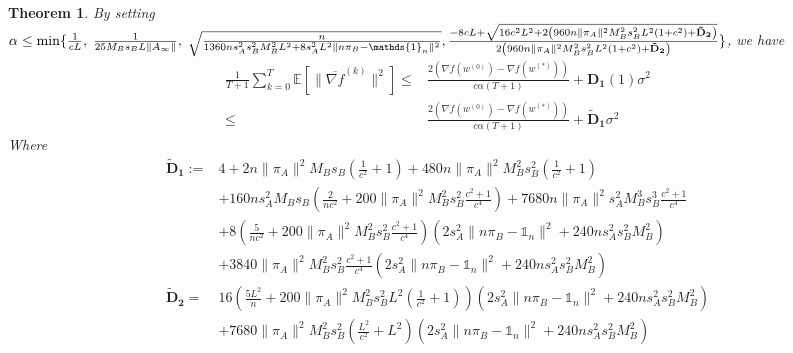 \documentclass{article}
\newtheorem{theorem}{Theorem}
\newcommand{\EE}[1]{\mathbb{E}\left[#1\right]}
\newcommand{\norm}[1]{\| #1 \|}
\newcommand{\one}{\mathds{1}_n}
\begin{document}
\begin{theorem}\label{Main Theorem: Basic 2}
  By setting $\alpha \leq \min\{\frac{1}{cL} ,\;\frac{1}{25M_Bs_BL\norm{A_{\infty}}},\; \sqrt{\frac{n}{1360ns_A^2s_B^2M_B^2L^2+8s_A^2L^2\norm{n\pi_B-\one}^2}},\; \\\frac{-8cL+\sqrt{16c^2L^2+2\left(960n\norm{\pi_A}^2M_B^2s_B^2L^2\left(1+c^2\right)+\mathbf{\tilde{D}_2}\right)}}{2\left(960n\norm{\pi_A}^2M_B^2s_B^2L^2\left(1+c^2\right)+\mathbf{\tilde{D}_2}\right)}\} $, we have 
  \begin{align*}
 \frac{1}{T+1}\sum_{k=0}^T\EE{\norm{\overline{\nabla f}^{(k)}}^2}\leq&\frac{2(\nabla f(w^{(0)})-\nabla f(w^{(*)}))}{c\alpha(T+1)}+\mathbf{D_1}(1)\sigma^2\\
 \leq&\frac{2(\nabla f(w^{(0)})-\nabla f(w^{(*)}))}{c\alpha(T+1)}+\mathbf{\tilde{D}_1}\sigma^2
\end{align*}
  Where 
  \begin{align*}
\mathbf{\tilde{D}_1}:=&4+2n\norm{\pi_A}^2M_Bs_B\left(\frac{1}{c^2}+1\right)+480n\norm{\pi_A}^2M_B^2s_B^2\left(\frac{1}{c^2}+1\right)\\
    &+160ns_A^2M_Bs_B\left(\frac{2}{nc^2}+200\norm{\pi_A}^2M_B^2s_B^2\frac{c^2+1}{c^4}\right)+7680n\norm{\pi_A}^2s_A^2M_B^3s_B^3\frac{c^2+1}{c^4}\\
    &+8\left(\frac{5}{nc^2}+200\norm{\pi_A}^2M_B^2s_B^2\frac{c^2+1}{c^4}\right)\left(2s_A^2\norm{n\pi_B-\one}^2+240ns_A^2s_B^2M_B^2\right)\\
    &+3840\norm{\pi_A}^2M_B^2s_B^2\frac{c^2+1}{c^4}\left(2s_A^2\norm{n\pi_B-\one}^2+240ns_A^2s_B^2M_B^2\right)\\
    \mathbf{\tilde{D}_2}=&16\left(\frac{5L^2}{n}+200\norm{\pi_A}^2M_B^2s_B^2L^2\left(\frac{1}{c^2}+1\right)\right)\left(2s_A^2\norm{n\pi_B-\one}^2+240ns_A^2s_B^2M_B^2\right) \\
  &+7680\norm{\pi_A}^2M_B^2s_B^2\left(\frac{L^2}{c^2}+ L^2\right)\left(2s_A^2\norm{n\pi_B-\one}^2+240ns_A^2s_B^2M_B^2\right)
  \end{align*}
\end{theorem}
\end{document}
